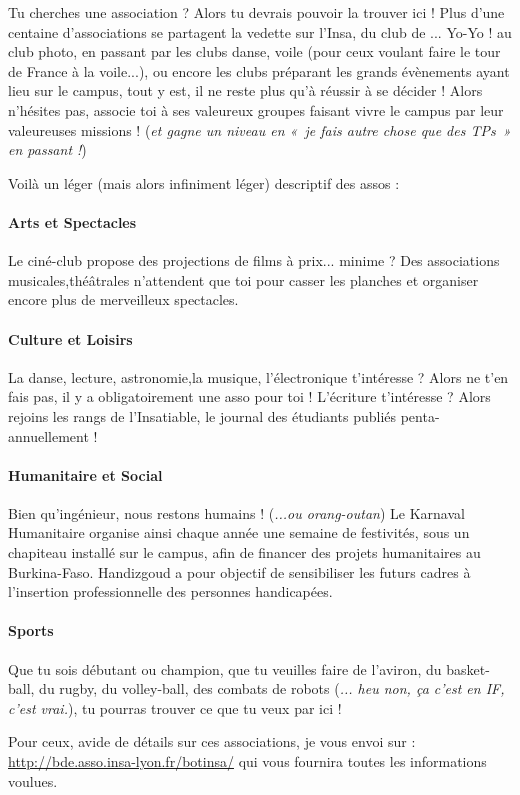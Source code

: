 Tu cherches une association ? Alors tu devrais pouvoir la trouver ici !
Plus d'une centaine d'associations se partagent la vedette sur l'Insa, du club
de ... Yo-Yo ! au club photo, en passant par les clubs danse, voile (pour ceux
voulant faire le tour de France à la voile...), ou encore les clubs
préparant les grands évènements ayant lieu sur le campus, tout y est, il ne
reste plus qu'à réussir à se décider !
Alors n'hésites pas, associe toi à ses valeureux groupes faisant vivre le campus
par leur valeureuses missions ! (\emph{et gagne un niveau en «~je fais autre chose que
des TPs~» en passant !})

Voilà un léger (mais alors infiniment léger) descriptif des assos :

\paragraph{Arts et Spectacles}
Le ciné-club propose des projections de films à prix... minime ?
Des associations musicales,théâtrales n'attendent que toi pour casser les planches et organiser encore plus de merveilleux spectacles.

\paragraph{Culture et Loisirs}
La danse, lecture, astronomie,la musique, l'électronique t'intéresse ?
Alors ne t'en fais pas, il y a obligatoirement une asso pour toi !
L'écriture t'intéresse ? Alors rejoins les rangs de l'Insatiable, le journal des étudiants publiés penta-annuellement !

\paragraph{Humanitaire et Social}
Bien qu'ingénieur, nous restons humains ! (\emph{...ou orang-outan})
Le Karnaval Humanitaire organise ainsi chaque année une semaine de festivités,
sous un chapiteau installé sur le campus, afin de financer des projets
humanitaires au Burkina-Faso.
Handizgoud a pour objectif de sensibiliser les futurs cadres à l'insertion
professionnelle des personnes handicapées.

\paragraph{Sports}
Que tu sois débutant ou champion, que tu veuilles faire de l'aviron, du
basket-ball, du rugby, du volley-ball, des combats de robots (\emph{... heu non, ça
c'est en IF, c'est vrai.}), tu pourras trouver ce que tu veux par ici !

Pour ceux, avide de détails sur ces associations, je vous envoi sur :
\url{http://bde.asso.insa-lyon.fr/botinsa/} qui vous fournira toutes les
informations voulues.

